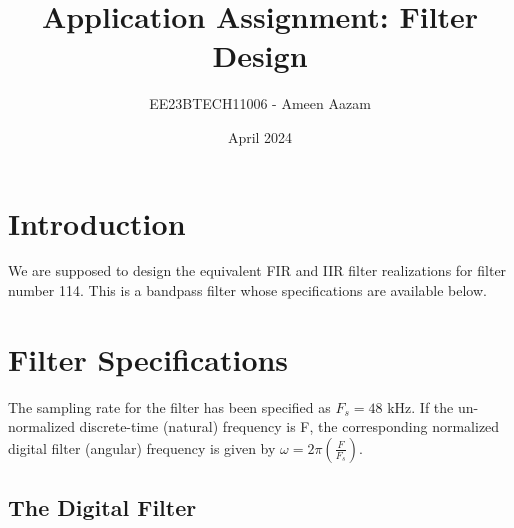 \documentclass{article}
\title{Application Assignment: Filter Design}
\author{EE23BTECH11006 - Ameen Aazam}
\date{April 2024}
\begin{document}
\maketitle

\section{Introduction}
We are supposed to design the equivalent FIR and IIR filter realizations for filter number 114.  
This is a bandpass filter whose specifications are available below.
\section{Filter Specifications}
The sampling rate for the filter has been specified as $F_s =  48$ kHz.	If the un-normalized  discrete-time (natural) frequency is F, the corresponding normalized digital filter (angular) frequency is given by $\omega = 2\pi
\left(\frac{F}{F_s}\right)$.
\subsection{The Digital Filter}
\end{document}
